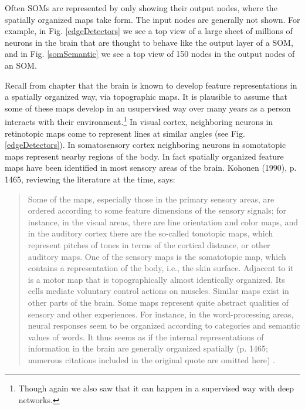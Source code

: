 Often SOMs are represented by only showing their output nodes, where the spatially organized maps take form. The input nodes are generally not shown. For example, in Fig. \ref{edgeDetectors} we see a top view of a large sheet of millions of neurons in the brain that are thought to behave like the output layer of a SOM, and in Fig. \ref{somSemantic} we see a top view of 150 nodes in the output nodes of an SOM.

Recall from chapter  that the brain is known to develop feature representations in a spatially organized way, via topographic maps. It is plausible to assume that some of these maps develop in an usupervised way over many years as a person interacts with their environment.\footnote{Though again we also saw that it can happen in a supervised way with deep networks.} In visual cortex, neighboring neurons in retinotopic maps come to represent lines at similar angles  (see Fig. \ref{edgeDetectors}). In somatosensory cortex neighboring neurons in somotatopic maps represent nearby regions of the body. In fact spatially organized feature maps have been identified in most sensory areas of the brain. Kohonen (1990), p. 1465, reviewing the literature at the time, says:

\begin{quotation}
Some of the maps, especially those in the primary sensory areas, are ordered according to some feature dimensions of the sensory signals; for instance, in the visual areas, there are line orientation and color maps, and in the auditory cortex there are the so-called tonotopic maps, which represent pitches of tones in terms of the cortical distance, or other auditory maps. One of the sensory maps is the somatotopic map, which contains a representation of the body, i.e., the skin surface. Adjacent to it is a motor map that is topographically almost identically organized. Its cells mediate voluntary control actions on muscles. Similar maps exist in other parts of the brain. Some maps represent quite abstract qualities of sensory and other experiences. For instance, in the word-processing areas, neural responses seem to be organized according to categories and semantic values of words. It thus seems as if the internal representations of information in the brain are generally organized spatially (p. 1465; numerous citations included in the original quote are omitted here) \cite{kohonen1990self}.
\end{quotation}

